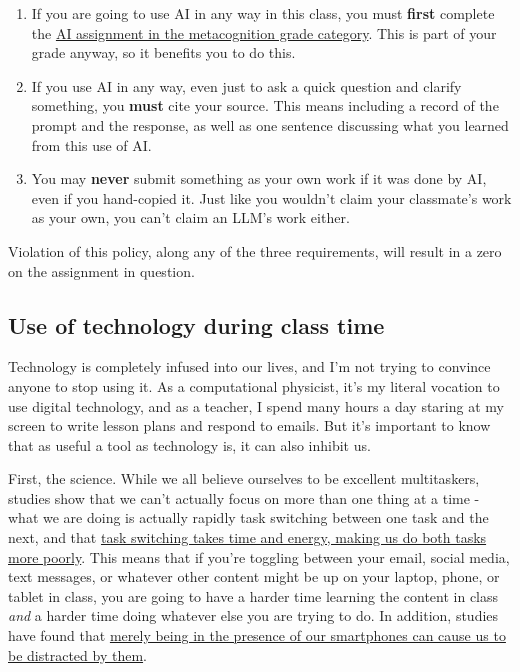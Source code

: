 \documentclass[
  letterpaper,
  DIV=11,
  numbers=noendperiod]{scrartcl}
\begin{document}
\begin{enumerate}
\def\labelenumi{\arabic{enumi}.}
\item
  If you are going to use AI in any way in this class, you must
  \textbf{first} complete the \hyperref[metacognitiongrade]{AI
  assignment in the metacognition grade category}. This is part of your
  grade anyway, so it benefits you to do this.
\item
  If you use AI in any way, even just to ask a quick question and
  clarify something, you \textbf{must} cite your source. This means
  including a record of the prompt and the response, as well as one
  sentence discussing what you learned from this use of AI.
\item
  You may \textbf{never} submit something as your own work if it was
  done by AI, even if you hand-copied it. Just like you wouldn't claim
  your classmate's work as your own, you can't claim an LLM's work
  either.
\end{enumerate}

Violation of this policy, along any of the three requirements, will
result in a zero on the assignment in question.

\subsection{Use of technology during class time}\label{distractions}

Technology is completely infused into our lives, and I'm not trying to
convince anyone to stop using it. As a computational physicist, it's my
literal vocation to use digital technology, and as a teacher, I spend
many hours a day staring at my screen to write lesson plans and respond
to emails. But it's important to know that as useful a tool as
technology is, it can also inhibit us.

First, the science. While we all believe ourselves to be excellent
multitaskers, studies show that we can't actually focus on more than one
thing at a time - what we are doing is actually rapidly task switching
between one task and the next, and that
\href{https://www.apa.org/topics/research/multitasking}{task switching
takes time and energy, making us do both tasks more poorly}. This means
that if you're toggling between your email, social media, text messages,
or whatever other content might be up on your laptop, phone, or tablet
in class, you are going to have a harder time learning the content in
class \emph{and} a harder time doing whatever else you are trying to do.
In addition, studies have found that
\href{https://www.journals.uchicago.edu/doi/full/10.1086/691462}{merely
being in the presence of our smartphones can cause us to be distracted
by them}.
\end{document}
